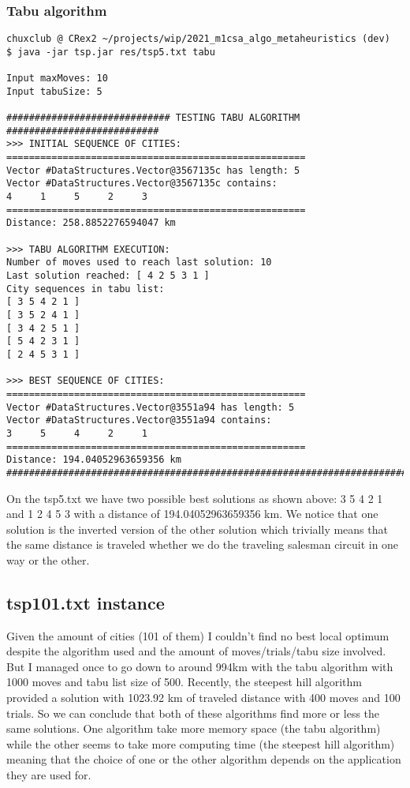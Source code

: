 \documentclass[./standalone.tex]{subfiles}
\begin{document}
\subsubsection{Tabu algorithm}
\begin{lstlisting}[style=Java, caption={Bash output of the execution of the tabu algorithm on the tsp5.txt instance}]
chuxclub @ CRex2 ~/projects/wip/2021_m1csa_algo_metaheuristics (dev)
$ java -jar tsp.jar res/tsp5.txt tabu

Input maxMoves: 10
Input tabuSize: 5

############################# TESTING TABU ALGORITHM ########################### 
>>> INITIAL SEQUENCE OF CITIES: 
===================================================== 
Vector #DataStructures.Vector@3567135c has length: 5
Vector #DataStructures.Vector@3567135c contains: 
4     1     5     2     3 
===================================================== 
Distance: 258.8852276594047 km

>>> TABU ALGORITHM EXECUTION: 
Number of moves used to reach last solution: 10
Last solution reached: [ 4 2 5 3 1 ]
City sequences in tabu list: 
[ 3 5 4 2 1 ]
[ 3 5 2 4 1 ]
[ 3 4 2 5 1 ]
[ 5 4 2 3 1 ]
[ 2 4 5 3 1 ]

>>> BEST SEQUENCE OF CITIES: 
===================================================== 
Vector #DataStructures.Vector@3551a94 has length: 5
Vector #DataStructures.Vector@3551a94 contains: 
3     5     4     2     1 
===================================================== 
Distance: 194.04052963659356 km
################################################################################ 	
\end{lstlisting}

On the tsp5.txt we have two possible best solutions as shown above: 3     5     4     2     1  and  1     2     4     5     3  with a distance of 194.04052963659356 km. We notice that one solution is the inverted version of the other solution which trivially means that the same distance is traveled whether we do the traveling salesman circuit in one way or the other.\\

	\subsection{tsp101.txt instance}
Given the amount of cities (101 of them) I couldn't find no best local optimum despite the algorithm used and the amount of moves/trials/tabu size involved. But I managed once to go down to around 994km with the tabu algorithm with 1000 moves and tabu list size of 500. Recently, the steepest hill algorithm provided a solution with 1023.92 km of traveled distance with 400 moves and 100 trials.  So we can conclude that both of these algorithms find more or less the same solutions. One algorithm take more memory space (the tabu algorithm) while the other seems to take more computing time (the steepest hill algorithm) meaning that the choice of one or the other algorithm depends on the application they are used for.
\end{document}
